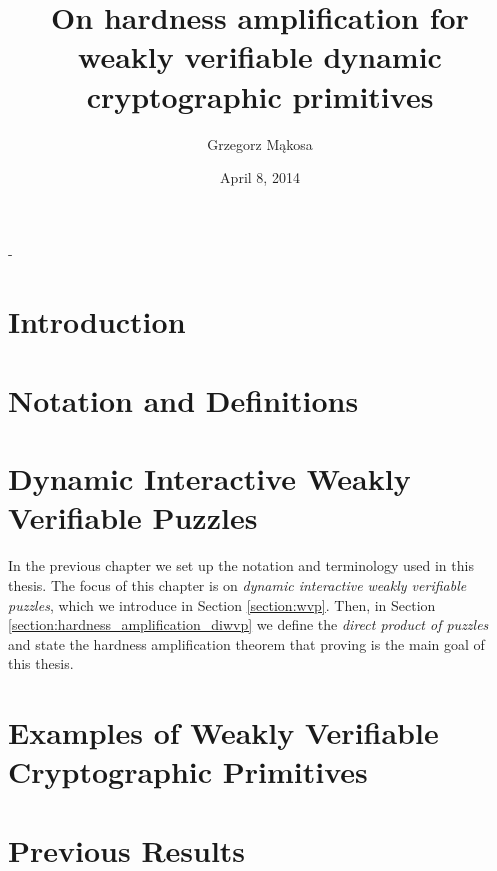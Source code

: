 \documentclass[11pt,a4paper,titlepage]{memoir}
\title{On hardness amplification for weakly verifiable dynamic cryptographic primitives}
\author{Grzegorz M\k{a}kosa}
\date{April 8, 2014}
\begin{document}
\frontmatter

\begin{titlingpage}
  \calccentering{\unitlength}
  \begin{adjustwidth*}{\unitlength-24pt}{-\unitlength-24pt}
    \maketitle
  \end{adjustwidth*}
\end{titlingpage}


%

%
\cleartorecto
\tableofcontents
\mainmatter
%
\chapter{Introduction}
\label{ch:introduction}

%
\chapter{Notation and Definitions}
\label{ch:preliminaries}

%
\chapter{Dynamic Interactive Weakly Verifiable Puzzles}
\label{ch:diwvp_main_thm}
In the previous chapter we set up the notation and terminology used in this thesis.
The focus of this chapter is on \textit{dynamic interactive weakly verifiable puzzles}, which we introduce in Section \ref{section:wvp}.
Then, in Section \ref{section:hardness_amplification_diwvp} we define the \textit{direct product of puzzles}
and state the hardness amplification theorem that proving is the main goal of this thesis.
%

%
\chapter{Examples of Weakly Verifiable Cryptographic Primitives}
\label{ch:examples_wvcp}

%
\chapter{Previous Results}
\label{ch:previous_results}

%
\end{document}

